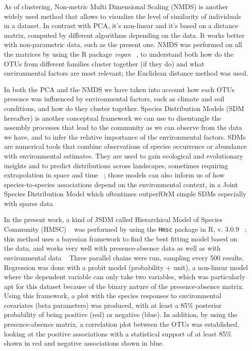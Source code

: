 As of clustering, Non-metric Multi Dimensional Scaling (NMDS) is another widely used method that allows to visualize the level of similarity of individuals in a dataset. In contrast with PCA, it's non-linear and it's based on a distance matrix, computed by different algorithms depending on the data. It works better with non-parametric data, such as the present one. NMDS was performed on all the matrices by using the R package \emph{vegan} ~\citep{dixon2003a}, to understand both how do the OTUs from different families cluster together (if they do) and what environmental factors are most relevant; the Euclidean distance method was used.

In both the PCA and the NMDS we have taken into account how each OTUs presence was influenced by environmental factors, such as climate and soil conditions, and how do they cluster together.
Species Distribution Models (SDM hereafter) is another conceptual framework we can use to disentangle the assembly processes that lead to the community as we can observe from the data we have, and to infer the relative importance of the environmental factors. SDMs are numerical tools that combine observations of species occurrence or abundance with environmental estimates. They are used to gain ecological and evolutionary insights and to predict distributions across landscapes, sometimes requiring extrapolation in space and time ~\citep{elith2009}; those models can also inform us of how species‐to‐species associations depend on the environmental context, in a Joint Species Distribution Model which oftentimes outperfOrM simple SDMs especially with sparse data ~\citep{pollock2014, tikhonov2017}

In the present work, a kind of JSDM called Hierarchical Model of Species Community (HMSC) ~\citep{ovaskainen2017} was performed by using the \texttt{Hmsc} package in R, v. 3.0.9 ~\citep{tikhonov2020, hmsc-r2021}; this method uses a bayesian framework to find the best fitting model based on the data, and works very well with presence-absence data as well as with environmental data ~\citep{hefley2016}
Three parallel chains were run, sampling every 500 results. Regression was done with a probit model (probability + unit), a non-linear model where the dependent variable can only take two variables, which was particularly apt for this dataset because of the binary nature of the presence-absence matrix.
Using this framework, a plot with the species responses to environmental covariates (beta parameters) was produced, with at least a 85\% posterior probability of being positive (red) or negative (blue).
In addition, by using the presence-absence matrix, a correlation plot between the OTUs was established, looking at the positive associations with a statistical support of at least 85\% shown in red and negative associations shown in blue.

